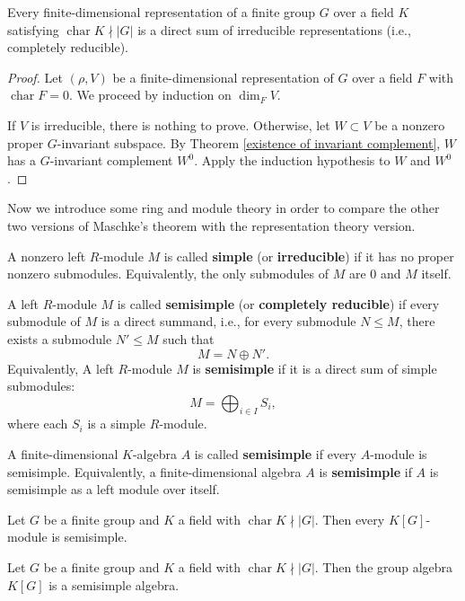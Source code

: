 \begin{prop}
Every finite-dimensional representation of a finite group \(G\) over a field $K$ satisfying  \(\operatorname{char} K \nmid |G|\) is a direct sum of irreducible representations (i.e., completely reducible).
\end{prop}
\begin{proof}
Let \((\rho, V)\) be a finite-dimensional representation of \(G\) over a field \(F\) with \(\operatorname{char} F = 0\). We proceed by induction on \(\dim_F V\).

If \(V\) is irreducible, there is nothing to prove. Otherwise, let \(W \subset V\) be a nonzero proper \(G\)-invariant subspace. By Theorem \ref{existence of invariant complement}, \(W\) has a \(G\)-invariant complement $W^0$.
Apply the induction hypothesis to \(W\) and $W^0$.
\end{proof}
Now we introduce some ring and module theory in order to compare the other two versions of Maschke's theorem with the representation theory version.

\begin{defn}
A nonzero left \(R\)-module \(M\) is called \textbf{simple} (or \textbf{irreducible}) 
if it has no proper nonzero submodules. Equivalently, the only submodules of \(M\) 
are \(0\) and \(M\) itself.


A left \(R\)-module \(M\) is called \textbf{semisimple} (or \textbf{completely reducible}) 
if every submodule of \(M\) is a direct summand, i.e., for every submodule \(N \leq M\), 
there exists a submodule \(N' \leq M\) such that 
\[
M = N \oplus N'.
\]
Equivalently, A left \(R\)-module \(M\) is \textbf{semisimple} if it is a direct sum of simple submodules:
\[
M = \bigoplus_{i \in I} S_i,
\]
where each \(S_i\) is a simple \(R\)-module.


A finite-dimensional \(K\)-algebra \(A\) is called \textbf{semisimple} if every \(A\)-module is semisimple.
Equivalently, a finite-dimensional algebra \(A\) is \textbf{semisimple} if \(A\) is semisimple as a left module over itself.
\end{defn}

\begin{thm}
\label{Maschke's Theorem, module form}
Let $G$ be a finite group and $K$ a field with $\operatorname{char} K \nmid |G|$. 
Then every $K[G]$-module is semisimple.
\end{thm}
\begin{thm}
\label{Maschke's Theorem, algebra form}
Let $G$ be a finite group and $K$ a field with $\operatorname{char} K \nmid |G|$. 
Then the group algebra $K[G]$ is a semisimple algebra.
\end{thm}

